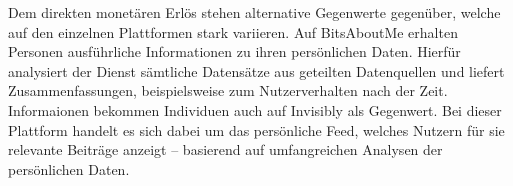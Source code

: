 \noindent Dem direkten monetären Erlös stehen alternative Gegenwerte gegenüber, welche auf den einzelnen Plattformen stark variieren. Auf BitsAboutMe erhalten Personen ausführliche Informationen zu ihren persönlichen Daten. Hierfür analysiert der Dienst sämtliche Datensätze aus geteilten Datenquellen und liefert Zusammenfassungen, beispielsweise zum Nutzerverhalten nach der Zeit. Informaionen bekommen Individuen auch auf Invisibly als Gegenwert. Bei dieser Plattform handelt es sich dabei um das persönliche Feed, welches Nutzern für sie relevante Beiträge anzeigt -- basierend auf umfangreichen Analysen der persönlichen Daten.
